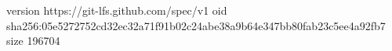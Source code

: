version https://git-lfs.github.com/spec/v1
oid sha256:05e5272752cd32ec32a71f91b02c24abe38a9b64e347bb80fab23c5ee4a92fb7
size 196704
